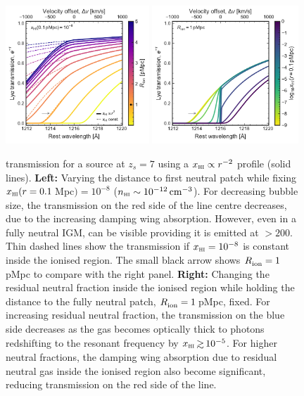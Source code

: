 \documentclass[fleqn,usenatbib]{mnras}
\begin{document}
\begin{figure}
    \includegraphics[width=0.48\textwidth]{figs/fig1a.pdf}
    \includegraphics[width=0.49\textwidth]{figs/fig1b.pdf}
    \caption{\lya transmission for a source at $z_s=7$ using a $\xHI \propto r^{-2}$ profile (solid lines). \textbf{Left:} Varying the distance to first neutral patch while fixing $\xHI(r=0.1\,$Mpc$) = 10^{-8}$ ($n_\HI \sim 10^{-12}\cm^{-3}$). For decreasing bubble size, the transmission on the red side of the \lya line centre decreases, due to the increasing damping wing absorption. However, even in a fully neutral IGM, \lya can be visible providing it is emitted at $>200$\kms. Thin dashed lines show the transmission if $\xHI=10^{-8}$ is constant inside the ionised region. The small black arrow shows $\Rion=1\,$pMpc to compare with the right panel. \textbf{Right:} Changing the residual neutral fraction inside the ionised region while holding the distance to the fully neutral patch, $\Rion=1\,$pMpc, fixed. For increasing residual neutral fraction, the transmission on the blue side decreases as the gas becomes optically thick to \lya photons redshifting to the resonant frequency by $\xHI \simgt 10^{-5}$. For higher neutral fractions, the damping wing absorption due to residual neutral gas inside the ionised region also become significant, reducing transmission on the red side of the line.}
    \label{fig:lya_transmission}
\end{figure}
\end{document}
